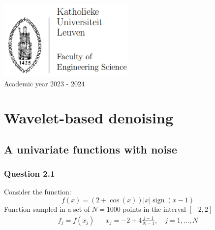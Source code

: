 \documentclass[a4paper]{article}
\DeclareMathOperator*{\sign}{sign}
\begin{document}
\begin{titlepage}
\begin{center}
			\includegraphics[width=0.5\textwidth]{Images/KUL_Eng_logo.png}\\
			{\Large{Academic year 2023 - 2024}}
			
		\end{center}
	\end{titlepage}
	
	\newpage
	
	\tableofcontents
	
	\newpage

    \section{Wavelet-based denoising}
 
	\subsection{A univariate functions with noise} \label{subsec:UniVariate}

    \subsubsection{Question 2.1}

	Consider the function:
    \begin{equation*}
	f(x) = (2+\cos{(x)}) |x| \sign{(x-1)}
	\end{equation*}
    Function sampled in a set of $N=1000$ points in the interval $[-2,2]$
    \begin{align*}
    	f_j = f(x_j) && x_j = -2 + 4\frac{j-1}{N-1}, \quad j=1,\ldots,N
    \end{align*}
    
\end{document}
